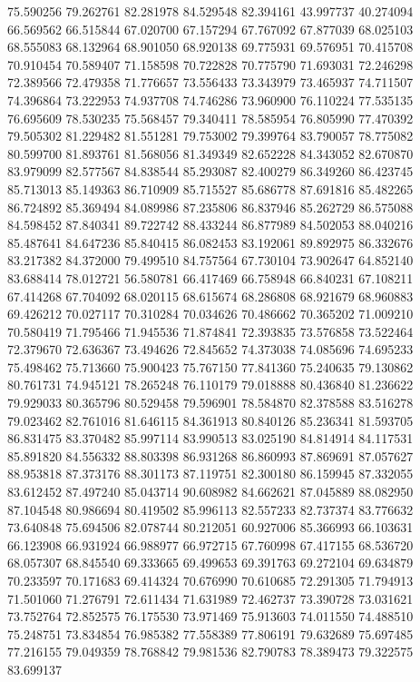 75.590256
79.262761
82.281978
84.529548
82.394161
43.997737
40.274094
66.569562
66.515844
67.020700
67.157294
67.767092
67.877039
68.025103
68.555083
68.132964
68.901050
68.920138
69.775931
69.576951
70.415708
70.910454
70.589407
71.158598
70.722828
70.775790
71.693031
72.246298
72.389566
72.479358
71.776657
73.556433
73.343979
73.465937
74.711507
74.396864
73.222953
74.937708
74.746286
73.960900
76.110224
77.535135
76.695609
78.530235
75.568457
79.340411
78.585954
76.805990
77.470392
79.505302
81.229482
81.551281
79.753002
79.399764
83.790057
78.775082
80.599700
81.893761
81.568056
81.349349
82.652228
84.343052
82.670870
83.979099
82.577567
84.838544
85.293087
82.400279
86.349260
86.423745
85.713013
85.149363
86.710909
85.715527
85.686778
87.691816
85.482265
86.724892
85.369494
84.089986
87.235806
86.837946
85.262729
86.575088
84.598452
87.840341
89.722742
88.433244
86.877989
84.502053
88.040216
85.487641
84.647236
85.840415
86.082453
83.192061
89.892975
86.332676
83.217382
84.372000
79.499510
84.757564
67.730104
73.902647
64.852140
83.688414
78.012721
56.580781
66.417469
66.758948
66.840231
67.108211
67.414268
67.704092
68.020115
68.615674
68.286808
68.921679
68.960883
69.426212
70.027117
70.310284
70.034626
70.486662
70.365202
71.009210
70.580419
71.795466
71.945536
71.874841
72.393835
73.576858
73.522464
72.379670
72.636367
73.494626
72.845652
74.373038
74.085696
74.695233
75.498462
75.713660
75.900423
75.767150
77.841360
75.240635
79.130862
80.761731
74.945121
78.265248
76.110179
79.018888
80.436840
81.236622
79.929033
80.365796
80.529458
79.596901
78.584870
82.378588
83.516278
79.023462
82.761016
81.646115
84.361913
80.840126
85.236341
81.593705
86.831475
83.370482
85.997114
83.990513
83.025190
84.814914
84.117531
85.891820
84.556332
88.803398
86.931268
86.860993
87.869691
87.057627
88.953818
87.373176
88.301173
87.119751
82.300180
86.159945
87.332055
83.612452
87.497240
85.043714
90.608982
84.662621
87.045889
88.082950
87.104548
80.986694
80.419502
85.996113
82.557233
82.737374
83.776632
73.640848
75.694506
82.078744
80.212051
60.927006
85.366993
66.103631
66.123908
66.931924
66.988977
66.972715
67.760998
67.417155
68.536720
68.057307
68.845540
69.333665
69.499653
69.391763
69.272104
69.634879
70.233597
70.171683
69.414324
70.676990
70.610685
72.291305
71.794913
71.501060
71.276791
72.611434
71.631989
72.462737
73.390728
73.031621
73.752764
72.852575
76.175530
73.971469
75.913603
74.011550
74.488510
75.248751
73.834854
76.985382
77.558389
77.806191
79.632689
75.697485
77.216155
79.049359
78.768842
79.981536
82.790783
78.389473
79.322575
83.699137
